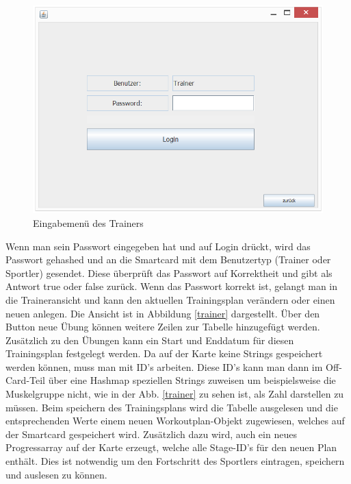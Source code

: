 \begin{figure}[h]
\includegraphics[width=1\hsize]{./images/login.png}
\caption{Eingabemenü des Trainers}
\label{login}
\end{figure}
\newpage
Wenn man sein Passwort eingegeben hat und auf Login drückt, wird das Passwort gehashed und an die Smartcard mit dem Benutzertyp (Trainer oder Sportler) gesendet. Diese überprüft das Passwort auf Korrektheit und gibt als Antwort true oder false zurück. Wenn das Passwort korrekt ist, gelangt man in die Traineransicht und kann den aktuellen Trainingsplan verändern oder einen neuen anlegen. Die Ansicht ist in Abbildung \ref{trainer} dargestellt. Über den Button neue Übung können weitere Zeilen zur Tabelle hinzugefügt werden. Zusätzlich zu den Übungen kann ein Start und Enddatum für diesen Trainingsplan festgelegt werden. Da auf der Karte keine Strings gespeichert werden können, muss man mit ID's arbeiten. Diese ID's kann man dann im Off-Card-Teil über eine Hashmap speziellen Strings zuweisen um beispielsweise die Muskelgruppe nicht, wie in der Abb. \ref{trainer} zu sehen ist, als Zahl darstellen zu müssen. Beim speichern des Trainingsplans wird die Tabelle ausgelesen und die entsprechenden Werte einem neuen Workoutplan-Objekt zugewiesen, welches auf der Smartcard gespeichert wird. Zusätzlich dazu wird, auch ein neues Progressarray auf der Karte erzeugt, welche alle Stage-ID's für den neuen Plan enthält. Dies ist notwendig um den Fortschritt des Sportlers eintragen, speichern und auslesen zu können.

